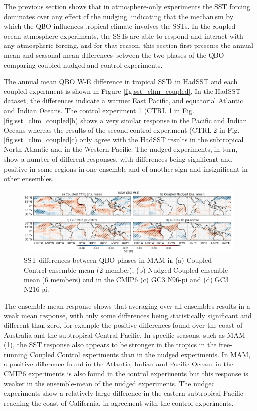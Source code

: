 The previous section shows that in atmosphere-only experiments the SST forcing dominates over any effect of the nudging, indicating that the mechanism by which the QBO influences tropical climate involves the SSTs. In the coupled ocean-atmosphere experiments, the SSTs are able to respond and interact with any atmospheric forcing, and for that reason, this section first presents the annual mean and seasonal mean differences between the two phases of the QBO comparing coupled nudged and control experiments. 

The annual mean QBO W-E difference in tropical SSTs in HadSST and each coupled experiment is shown in Figure \ref{fig:sst_clim_coupled}. In the HadSST dataset, the differences indicate a warmer East Pacific, and equatorial Atlantic and Indian Oceans. The control experiment 1 (CTRL 1 in Fig. \ref{fig:sst_clim_coupled}b) shows a very similar response in the Pacific and Indian Oceans whereas the results of the second control experiment (CTRL 2 in Fig. \ref{fig:sst_clim_coupled}c) only agree with the HadSST results in the subtropical North Atlantic and in the Western Pacific. 
The nudged experiments, in turn, show a number of different responses, with differences being significant and positive in some regions in one ensemble and of another sign and insignificant in other ensembles. 

\begin{figure}[t!]
\centering
 \includegraphics[width=\linewidth]{figures/sstseasonal_mamqbowqboe.png}
\caption[SST response in MAM to the QBO in coupled nudged experiments]{ SST differences between QBO phases in MAM in (a) Coupled Control ensemble mean (2-member), (b) Nudged Coupled ensemble mean (6 members) and in the CMIP6 (c) GC3 N96-pi and (d) GC3 N216-pi.}
\label{fig:sst_mam_coupled}
\end{figure}

The ensemble-mean response shows that averaging over all ensembles results in a weak mean response, with only some differences being statistically significant and different than zero, for example the positive differences found over the coast of Australia and the subtropical Central Pacific. 
In specific seasons, such as MAM (\ref{fig:sst_mam_coupled}), the SST response also appears to be stronger in the tropics in the free-running Coupled Control experiments than in the nudged experiments. 
In MAM, a positive difference found in the Atlantic, Indian and Pacific Oceans in the CMIP6 experiments is also found in the control experiments but this response is weaker in the ensemble-mean of the nudged experiments.
The nudged experiments show a relatively large difference in the eastern subtropical Pacific reaching the coast of California, in agreement with the control experiments.

